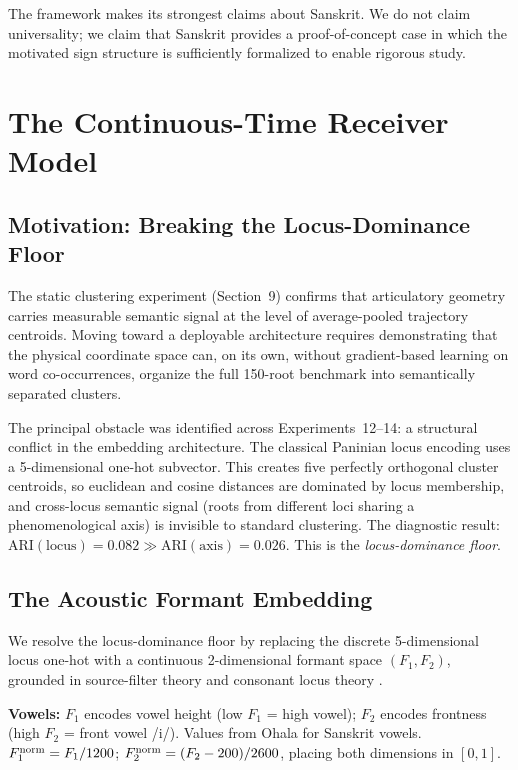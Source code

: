 \documentclass[12pt]{article}
\begin{document}
The framework makes its strongest claims about Sanskrit. We do not claim universality; we claim that Sanskrit provides a proof-of-concept case in which the motivated sign structure is sufficiently formalized to enable rigorous study.


\section{The Continuous-Time Receiver Model}
\label{sec:receiver}

\subsection{Motivation: Breaking the Locus-Dominance Floor}

The static clustering experiment (Section~9) confirms that articulatory geometry carries measurable semantic signal at the level of average-pooled trajectory centroids. Moving toward a deployable architecture requires demonstrating that the physical coordinate space can, on its own, without gradient-based learning on word co-occurrences, organize the full 150-root benchmark into semantically separated clusters.

The principal obstacle was identified across Experiments~12--14: a structural conflict in the embedding architecture. The classical Paninian locus encoding uses a 5-dimensional one-hot subvector. This creates five perfectly orthogonal cluster centroids, so euclidean and cosine distances are dominated by locus membership, and cross-locus semantic signal (roots from different loci sharing a phenomenological axis) is invisible to standard clustering. The diagnostic result: $\text{ARI}(\text{locus}) = 0.082 \gg \text{ARI}(\text{axis}) = 0.026$. This is the \textit{locus-dominance floor}.

\subsection{The Acoustic Formant Embedding}

We resolve the locus-dominance floor by replacing the discrete 5-dimensional locus one-hot with a continuous 2-dimensional formant space $(F_1, F_2)$, grounded in source-filter theory \cite{fant1960} and consonant locus theory \cite{sussman1991}.

\textbf{Vowels:} $F_1$ encodes vowel height (low $F_1$ = high vowel); $F_2$ encodes frontness (high $F_2$ = front vowel /i/). Values from Ohala \cite{ohala1983} for Sanskrit vowels. $F_1^{\rm norm} = F_1/1200$; $F_2^{\rm norm} = (F_2 - 200)/2600$, placing both dimensions in $[0,1]$.
\end{document}
